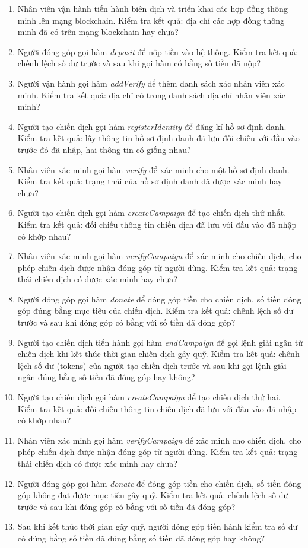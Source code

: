 \documentclass[../main-report.tex]{subfiles}
\begin{document}
\begin{enumerate}[label=(\arabic*)]
\item Nhân viên vận hành tiến hành biên dịch và triển khai các hợp đồng thông minh lên mạng blockchain. Kiểm tra kết quả: địa chỉ các hợp đồng thông minh đã có trên mạng blockchain hay chưa?
\item Người đóng góp gọi hàm \textit{deposit} để nộp tiền vào hệ thống. Kiểm tra kết quả: chênh lệch số dư trước và sau khi gọi hàm có bằng số tiền đã nộp?
\item Người vận hành gọi hàm \textit{addVerify} để thêm danh sách xác nhân viên xác minh. Kiểm tra kết quả: địa chỉ có trong danh sách địa chỉ nhân viên xác minh?
\item Người tạo chiến dịch gọi hàm \textit{registerIdentity} để đăng kí hồ sơ định danh. Kiểm tra kết quả: lấy thông tin hồ sơ định danh đã lưu đối chiếu với đầu vào trước đó đã nhập, hai thông tin có giống nhau?
\item Nhân viên xác minh gọi hàm \textit{verify} để xác minh cho một hồ sơ định danh. Kiểm tra kết quả: trạng thái của hồ sơ định danh đã được xác minh hay chưa?
\item Người tạo chiến dịch gọi hàm \textit{createCampaign} để tạo chiến dịch thứ nhất. Kiểm tra kết quả: đối chiếu thông tin chiến dịch đã lưu với đầu vào đã nhập có khớp nhau?
\item Nhân viên xác minh gọi hàm \textit{verifyCampaign} để xác minh cho chiến dịch, cho phép chiến dịch được nhận đóng góp từ người dùng. Kiểm tra kết quả: trạng thái chiến dịch có được xác minh hay chưa?
\item Người đóng góp gọi hàm \textit{donate} để đóng góp tiền cho chiến dịch, số tiền đóng góp đúng bằng mục tiêu của chiến dịch. Kiểm tra kết quả: chênh lệch số dư trước và sau khi đóng góp có bằng với số tiền đã đóng góp?
\item Người tạo chiến dịch tiến hành gọi hàm \textit{endCampaign} để gọi lệnh giải ngân từ chiến dịch khi kết thúc thời gian chiến dịch gây quỹ. Kiểm tra kết quả: chênh lệch số dư (tokens) của người tạo chiến dịch trước và sau khi gọi lệnh giải ngân đúng bằng số tiền đã đóng góp hay không?
\item Người tạo chiến dịch gọi hàm \textit{createCampaign} để tạo chiến dịch thứ hai. Kiểm tra kết quả: đối chiếu thông tin chiến dịch đã lưu với đầu vào đã nhập có khớp nhau?
\item Nhân viên xác minh gọi hàm \textit{verifyCampaign} để xác minh cho chiến dịch, cho phép chiến dịch được nhận đóng góp từ người dùng. Kiểm tra kết quả: trạng thái chiến dịch có được xác minh hay chưa?
\item Người đóng góp gọi hàm \textit{donate} để đóng góp tiền cho chiến dịch, số tiền đóng góp không đạt được mục tiêu gây quỹ. Kiểm tra kết quả: chênh lệch số dư trước và sau khi đóng góp có bằng với số tiền đã đóng góp?
\item Sau khi kết thúc thời gian gây quỹ, người đóng góp tiến hành kiểm tra số dư có đúng bằng số tiền đã đúng bằng số tiền đã đóng góp hay không?
\end{enumerate}
\end{document}
